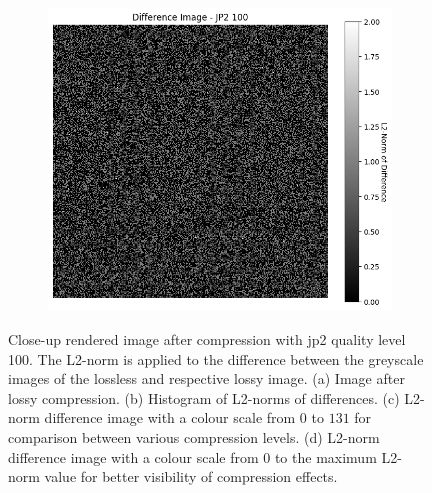 \begin{figure}[htb]
\begin{subfigure}[b]{0.48\textwidth}
        \caption{}
        \label{fig:img_quality_comp_jp2_100_center_diff}
    \end{subfigure}
    \begin{subfigure}[b]{0.48\textwidth}
        \centering
        \includegraphics[width=\textwidth]{doc/thesis/0_figures/compare_quality/set1/jp2_100_center_diff_heatmap_rel.png}
        \caption{}
        \label{fig:img_quality_comp_jp2_100_center_diff_rel}
    \end{subfigure}
    \caption{Close-up rendered image after compression with \gls{jp2} quality level 100. The L2-norm is applied to the difference between the greyscale images of the lossless and respective lossy image. (a) Image after lossy compression. (b) Histogram of L2-norms of differences. (c) L2-norm difference image with a colour scale from $0$ to $131$ for comparison between various compression levels. (d) L2-norm difference image with a colour scale from $0$ to the maximum L2-norm value for better visibility of compression effects.}
    \label{fig:img_quality_comp_jp2_100_center}
\end{figure}

